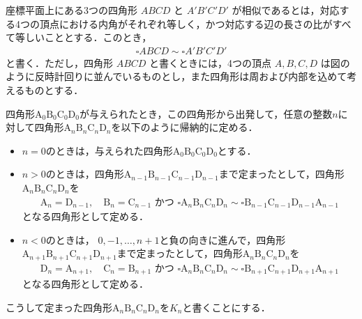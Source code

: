 \documentclass[../../main.tex]{subfiles}
\begin{document}
座標平面上にある3つの四角形 $ABCD$ と $A'B'C'D'$ が相似であるとは，対応する4つの頂点における内角がそれぞれ等しく，かつ対応する辺の長さの比がすべて等しいこととする．このとき，
\begin{align}
  \square ABCD \sim \square A'B'C'D'
\end{align}
と書く．ただし，四角形 $ABCD$ と書くときには，4つの頂点 $A, B, C, D$ は図のように反時計回りに並んでいるものとし，また四角形は周および内部を込めて考えるものとする．

四角形$\text{A}_0 \text{B}_0 \text{C}_0 \text{D}_0$が与えられたとき，この四角形から出発して，任意の整数$n$に対して四角形$\text{A}_n \text{B}_n \text{C}_n \text{D}_n$を以下のように帰納的に定める．

\begin{itemize}
  \item[(I)] $n = 0$のときは，与えられた四角形$\text{A}_0 \text{B}_0 \text{C}_0 \text{D}_0$とする．
  \item[(II)] $n > 0$のときは，四角形$\text{A}_{n-1} \text{B}_{n-1} \text{C}_{n-1} \text{D}_{n-1}$まで定まったとして，四角形$\text{A}_n \text{B}_n \text{C}_n \text{D}_n$を
    \begin{align}
      \text{A}_n = \text{D}_{n-1}, \quad \text{B}_n = \text{C}_{n-1} \text{ かつ } \square\text{A}_n \text{B}_n \text{C}_n \text{D}_n \sim \square \text{B}_{n-1} \text{C}_{n-1} \text{D}_{n-1} \text{A}_{n-1}
    \end{align}
    となる四角形として定める．
  \item[(III)] $n < 0$のときは， $0, -1, \dots, n+1$と負の向きに進んで，四角形$\text{A}_{n+1} \text{B}_{n+1} \text{C}_{n+1} \text{D}_{n+1}$まで定まったとして，四角形$\text{A}_n \text{B}_n \text{C}_n \text{D}_n$を
    \begin{align}
      \text{D}_n = \text{A}_{n+1}, \quad \text{C}_n = \text{B}_{n+1} \text{ かつ } \square \text{A}_n \text{B}_n \text{C}_n \text{D}_n \sim \square \text{B}_{n+1} \text{C}_{n+1} \text{D}_{n+1} \text{A}_{n+1}
    \end{align}
    となる四角形として定める．
\end{itemize}

こうして定まった四角形$\text{A}_n \text{B}_n \text{C}_n \text{D}_n$を$K_n$と書くことにする．
\end{document}
